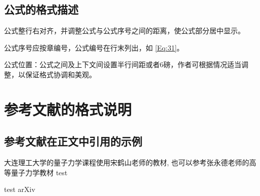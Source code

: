 \subsection{公式的格式描述}

\begin{asparaenum}[(1)]
\item 公式整行右对齐，并调整公式与公式序号之间的距离，使公式部分居中显示。

\item 公式序号应按章编号，公式编号在行末列出，如 \eqref{Eq:31}。

\item 公式位置：公式之间及上下文间设置半行间距或者6磅，作者可根据情况适当调整，以保证格式协调和美观。
\end{asparaenum}

\section{参考文献的格式说明}

\subsection{参考文献在正文中引用的示例}
大连理工大学的量子力学课程使用宋鹤山老师的教材\cite{BOOK.hssong2006},
也可以参考张永德老师的高等量子力学教材\cite{BOOK.Zhang2009}
test\cite{Dyson:1949ha,Andrews2014,Barzanjeh2012,Barzanjeh2011}

test arXiv\cite{Basar:2021gyi,Ding:2020inp}
